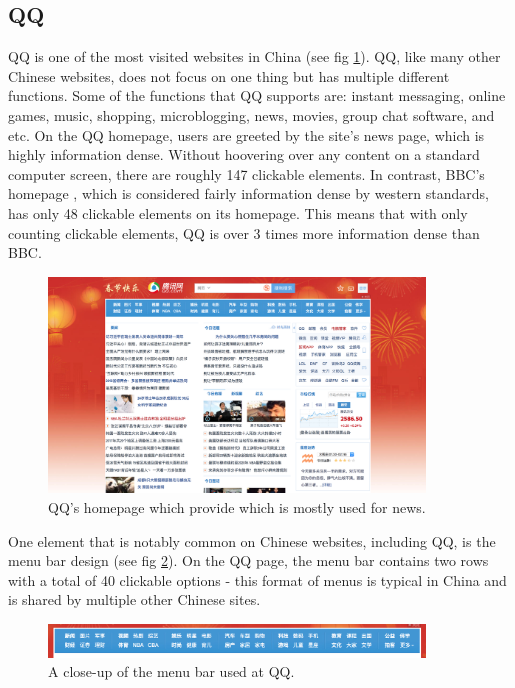 \subsection{QQ}
QQ is one of the  most visited websites in China (see fig \ref{fig:QQ.com}). \cite{top_sites_china} \cite{top_sites_alexa} QQ, like many other Chinese websites, does not focus on one thing but has multiple different functions. Some of the functions that QQ supports are: instant messaging, online  games, music, shopping, microblogging, news, movies, group chat software, and etc. On the QQ homepage, users are greeted by the site's news page, which is highly information dense. Without hoovering over any content on a standard computer screen, there are roughly 147 clickable elements.  In contrast,  BBC's homepage \cite{bbc}, which is considered fairly information dense by western standards, has only 48 clickable elements on its homepage. This means that with only counting clickable elements, QQ is over 3 times more information dense than BBC. 


\begin{figure}[h]
\centering
\includegraphics[width=100mm]{Images/QQ.png}
\decoRule
\caption[QQ.com]{QQ's homepage which provide which is mostly used for news.}
\label{fig:QQ.com}
\end{figure}
One element that is notably common on Chinese websites, including QQ, is the menu bar design (see fig \ref{fig:QQ_menubar}). On the QQ page, the menu bar contains two rows with a total of 40 clickable options - this format of menus is typical in China and is shared by multiple  other Chinese sites. 


\begin{figure}[h]
\centering
\includegraphics[width=100mm]{Images/QQ_menubar.png}
\decoRule
\caption[QQ's Menu bar]{A close-up of the menu bar used at QQ.}
\label{fig:QQ_menubar}
\end{figure}

